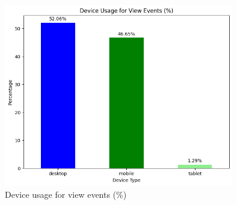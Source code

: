 \begin{figure}[H]\centering
\includegraphics[width=100mm]{img/chap08/tracking_page_devices.png}
\caption{Device usage for view events (\%)}
\label{img08:plot:tracking_page_device_type}
\end{figure}

